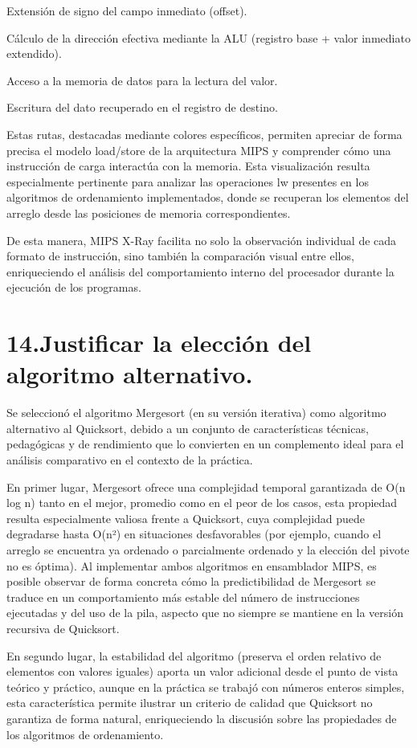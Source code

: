 \documentclass[12pt, letterpaper]{article}
\begin{document}
Extensión de signo del campo inmediato (offset).

Cálculo de la dirección efectiva mediante la ALU (registro base + valor inmediato extendido).

Acceso a la memoria de datos para la lectura del valor.

Escritura del dato recuperado en el registro de destino.

Estas rutas, destacadas mediante colores específicos, permiten apreciar de forma precisa el modelo load/store de la arquitectura MIPS y comprender cómo una instrucción de carga interactúa con la memoria. Esta visualización resulta especialmente pertinente para analizar las operaciones lw presentes en los algoritmos de ordenamiento implementados, donde se recuperan los elementos del arreglo desde las posiciones de memoria correspondientes.

De esta manera, MIPS X-Ray facilita no solo la observación individual de cada formato de instrucción, sino también la comparación visual entre ellos, enriqueciendo el análisis del comportamiento interno del procesador durante la ejecución de los programas.\newpage

\section*{14.Justificar la elección del algoritmo alternativo.}

Se seleccionó el algoritmo Mergesort (en su versión iterativa) como algoritmo alternativo al Quicksort, debido a un conjunto de características técnicas, pedagógicas y de rendimiento que lo convierten en un complemento ideal para el análisis comparativo en el contexto de la práctica.

En primer lugar, Mergesort ofrece una complejidad temporal garantizada de O(n log n) tanto en el mejor, promedio como en el peor de los casos, esta propiedad resulta especialmente valiosa frente a Quicksort, cuya complejidad puede degradarse hasta O(n²) en situaciones desfavorables (por ejemplo, cuando el arreglo se encuentra ya ordenado o parcialmente ordenado y la elección del pivote no es óptima). Al implementar ambos algoritmos en ensamblador MIPS, es posible observar de forma concreta cómo la predictibilidad de Mergesort se traduce en un comportamiento más estable del número de instrucciones ejecutadas y del uso de la pila, aspecto que no siempre se mantiene en la versión recursiva de Quicksort.

En segundo lugar, la estabilidad del algoritmo (preserva el orden relativo de elementos con valores iguales) aporta un valor adicional desde el punto de vista teórico y práctico, aunque en la práctica se trabajó con números enteros simples, esta característica permite ilustrar un criterio de calidad que Quicksort no garantiza de forma natural, enriqueciendo la discusión sobre las propiedades de los algoritmos de ordenamiento.
\end{document}
